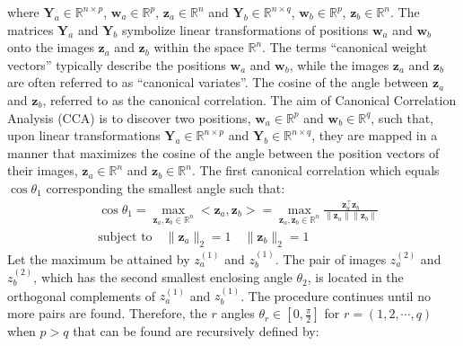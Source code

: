 where $\mathbf{Y}_a\in \mathbb{R}^{n\times p}$, ${\mathbf w}_a\in\mathbb{R}^p$, ${\mathbf z}_a\in\mathbb{R}^n$  and $\mathbf{Y}_b\in \mathbb{R}^{n\times q}$, $\mathbf{w}_b\in\mathbb{R}^p$, ${\mathbf z}_b\in\mathbb{R}^n$. The matrices $\mathbf{Y}_a$ and $\mathbf{Y}_b$ symbolize linear transformations of positions ${\mathbf w}_a$ and ${\mathbf w}_b$ onto the images ${\mathbf z}_a$ and ${\mathbf z}_b$ within the space $\mathbb{R}^n$. The terms ``canonical weight vectors'' typically describe the positions ${\mathbf w}_a$ and ${\mathbf w}_b$, while the images ${\mathbf z}_a$ and ${\mathbf z}_b$ are often referred to as ``canonical variates''. The cosine of the angle between ${\mathbf z}_a$ and ${\mathbf z}_b$, referred to as the canonical correlation. The aim of Canonical Correlation Analysis (CCA) is to discover two positions, $\mathbf{w}_a \in \mathbb{R}^p$ and $\mathbf{w}_b \in \mathbb{R}^q$, such that, upon linear transformations $\mathbf{Y}_a \in \mathbb{R}^{n\times p}$ and $\mathbf{Y}_b \in \mathbb{R}^{n\times q}$, they are mapped in a manner that maximizes the cosine of the angle between the position vectors of their images, $\mathbf{z}_a \in \mathbb{R}^n$ and $\mathbf{z}_b \in \mathbb{R}^n$. The first canonical correlation which equals $\cos\theta_1$ corresponding the smallest angle such that:
\begin{equation}
\begin{aligned}
&\cos \theta_1 = \underset{{\mathbf z}_a, {\mathbf z}_b \in\mathbb{R}^n}{\max}<{\mathbf z}_a, {\mathbf z}_b>
			   = \underset{{\mathbf z}_a, {\mathbf z}_b \in\mathbb{R}^n}{\max}
			   		 \frac{\mathbf{z}_a^\top \mathbf{z}_b}{\|\mathbf{z}_a\| \|\mathbf{z}_b\|} \\
&\text{subject to}\quad \|{\mathbf z}_a\|_2=1\quad \|{\mathbf z}_b\|_2=1
\end{aligned}
\end{equation}
Let the maximum be attained by $z_{a}^{(1)}$ and $z_{b}^{(1)}$. The pair of images $z_{a}^{(2)}$ and $z_{b}^{(2)}$, which has the second smallest enclosing angle $\theta_2$, is located in the orthogonal complements of $z_{a}^{(1)}$ and $z_{b}^{(1)}$. The procedure continues until no more pairs are found. Therefore, the $r$ angles $\theta_r \in [0, \frac{\pi}{2}]$ for $r = (1,2,\cdots,q)$ when $p > q$ that can be found are recursively defined by:

